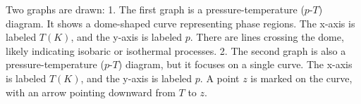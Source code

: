 Two graphs are drawn:  
1. The first graph is a pressure-temperature (\(p\)-\(T\)) diagram. It shows a dome-shaped curve representing phase regions. The x-axis is labeled \(T(K)\), and the y-axis is labeled \(p\). There are lines crossing the dome, likely indicating isobaric or isothermal processes.  
2. The second graph is also a pressure-temperature (\(p\)-\(T\)) diagram, but it focuses on a single curve. The x-axis is labeled \(T(K)\), and the y-axis is labeled \(p\). A point \(z\) is marked on the curve, with an arrow pointing downward from \(T\) to \(z\).